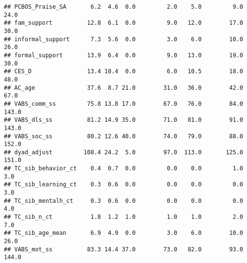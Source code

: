 \documentclass[
]{article}
\newenvironment{Shaded}{\begin{snugshade}}{\end{snugshade}}
\newcommand{\FunctionTok}[1]{\textcolor[rgb]{0.00,0.00,0.00}{#1}}
\newcommand{\NormalTok}[1]{#1}
\newcommand{\SpecialCharTok}[1]{\textcolor[rgb]{0.00,0.00,0.00}{#1}}
\begin{document}
\begin{verbatim}
## PCBOS_Praise_SA       6.2  4.6  0.0         2.0    5.0         9.0  24.0
## fam_support          12.8  6.1  0.0         9.0   12.0        17.0  30.0
## informal_support      7.3  5.6  0.0         3.0    6.0        10.0  26.0
## formal_support       13.9  6.4  0.0         9.0   13.0        19.0  30.0
## CES_D                13.4 10.4  0.0         6.0   10.5        18.0  48.0
## AC_age               37.6  8.7 21.0        31.0   36.0        42.0  67.0
## VABS_comm_ss         75.8 13.8 17.0        67.0   76.0        84.0 143.0
## VABS_dls_ss          81.2 14.9 35.0        71.0   81.0        91.0 143.0
## VABS_soc_ss          80.2 12.6 40.0        74.0   79.0        88.0 152.0
## dyad_adjust         108.4 24.2  5.0        97.0  113.0       125.0 151.0
## TC_sib_behavior_ct    0.4  0.7  0.0         0.0    0.0         1.0   3.0
## TC_sib_learning_ct    0.3  0.6  0.0         0.0    0.0         0.0   3.0
## TC_sib_mentalh_ct     0.3  0.6  0.0         0.0    0.0         0.0   4.0
## TC_sib_n_ct           1.8  1.2  1.0         1.0    1.0         2.0   7.0
## TC_sib_age_mean       6.9  4.9  0.0         3.0    6.0        10.0  26.0
## VABS_mot_ss          83.3 14.4 37.0        73.0   82.0        93.0 144.0
\end{verbatim}

\begin{Shaded}
\end{Shaded}
\end{document}

